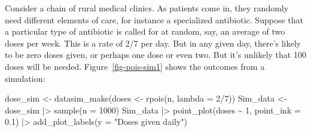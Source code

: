 \documentclass[
  letterpaper,
  DIV=11,
  numbers=noendperiod,
  oneside]{scrartcl}
\newenvironment{Shaded}{\begin{snugshade}}{\end{snugshade}}
\newcommand{\AttributeTok}[1]{\textcolor[rgb]{0.40,0.45,0.13}{#1}}
\newcommand{\DecValTok}[1]{\textcolor[rgb]{0.68,0.00,0.00}{#1}}
\newcommand{\FloatTok}[1]{\textcolor[rgb]{0.68,0.00,0.00}{#1}}
\newcommand{\FunctionTok}[1]{\textcolor[rgb]{0.28,0.35,0.67}{#1}}
\newcommand{\NormalTok}[1]{\textcolor[rgb]{0.00,0.23,0.31}{#1}}
\newcommand{\OtherTok}[1]{\textcolor[rgb]{0.00,0.23,0.31}{#1}}
\newcommand{\SpecialCharTok}[1]{\textcolor[rgb]{0.37,0.37,0.37}{#1}}
\newcommand{\StringTok}[1]{\textcolor[rgb]{0.13,0.47,0.30}{#1}}
\begin{document}
\begin{tcolorbox}[enhanced jigsaw, colbacktitle=quarto-callout-note-color!10!white, opacityback=0, breakable, opacitybacktitle=0.6, colback=white, coltitle=black, arc=.35mm, title=\textcolor{quarto-callout-note-color}{\faInfo}\hspace{0.5em}{Example: Medical clinic logistics}, left=2mm, colframe=quarto-callout-note-color-frame, rightrule=.15mm, bottomrule=.15mm, leftrule=.75mm, bottomtitle=1mm, toptitle=1mm, titlerule=0mm, toprule=.15mm]

Consider a chain of rural medical clinics. As patients come in, they
randomly need different elements of care, for instance a specialized
antibiotic. Suppose that a particular type of antibiotic is called for
at random, say, an average of two doses per week. This is a rate of 2/7
per day. But in any given day, there's likely to be zero doses given, or
perhaps one dose or even two. But it's unlikely that 100 doses will be
needed. Figure~\ref{fig-pois-sim1} shows the outcomes from a simulation:

\begin{Shaded}
\begin{Highlighting}[]
\NormalTok{dose\_sim }\OtherTok{\textless{}{-}} \FunctionTok{datasim\_make}\NormalTok{(doses }\OtherTok{\textless{}{-}} \FunctionTok{rpois}\NormalTok{(n, }\AttributeTok{lambda =} \DecValTok{2}\SpecialCharTok{/}\DecValTok{7}\NormalTok{))}
\NormalTok{Sim\_data }\OtherTok{\textless{}{-}}\NormalTok{ dose\_sim }\SpecialCharTok{|\textgreater{}} \FunctionTok{sample}\NormalTok{(}\AttributeTok{n =} \DecValTok{1000}\NormalTok{)}
\NormalTok{Sim\_data }\SpecialCharTok{|\textgreater{}} \FunctionTok{point\_plot}\NormalTok{(doses }\SpecialCharTok{\textasciitilde{}} \DecValTok{1}\NormalTok{, }\AttributeTok{point\_ink =} \FloatTok{0.1}\NormalTok{) }\SpecialCharTok{|\textgreater{}}
  \FunctionTok{add\_plot\_labels}\NormalTok{(}\AttributeTok{y =} \StringTok{"Doses given daily"}\NormalTok{) }
\end{Highlighting}
\end{Shaded}

\begin{figure}[H]

\end{figure}
\end{tcolorbox}
\end{document}
